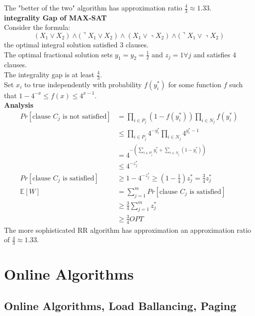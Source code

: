 \documentclass[onecolumn]{report}
\begin{document}
The "better of the two" algorithm has approximation ratio $\frac{4}{3}\approx 1.33$.\\
\textbf{integrality Gap of MAX-SAT}\\
Consider the formula:
\begin{equation*}
    \left.\left.\left.\left.\left(X_1 \vee X_2\right) \wedge(\urcorner X_1 \vee X_2\right) \wedge\left(X_1 \vee\right\urcorner X_2\right) \wedge(\urcorner X_1 \vee\right\urcorner X_2\right)
\end{equation*}
the optimal integral solution satisfied 3 clauses.\\
The optimal fractional solution sets $y_1=y_2=\frac{1}{2}$ and $z_j =1 \forall j$ and satisfies 4 clauses.\\
The integrality gap is at least $\frac{4}{3}$.\\
Set $x_i$ to true independently with probability $f(y_i^*)$ for some function $f$ such that $1-4^{-x} \leq f(x) \leq 4^{x-1}$.\\
\textbf{Analysis}\\
\begin{align*}
    Pr[\text{clause } C_j \text{ is not satisfied}] &= \prod_{i \in P_j}(1-f(y_i^*))\prod_{i \in N_j}f(y_i^*)\\
    &\leq \prod_{i \in P_j}4^{-y_i^*}\prod_{i \in N_j}4^{y_i^*-1}\\
    &= 4^{-\left(\sum_{i \in P_j}y_i^*+\sum_{i \in N_j}(1-y_i^*)\right)}\\
    &\leq 4^{-z_j^*}\\
    Pr[\text{clause } C_j \text{ is satisfied}] &\geq 1-4^{-z_j^*}\geq \left(1-\frac{1}{4}\right)z_j^* = \frac{3}{4}z_j^*\\
    \mathbb{E}[W] &= \sum_{j=1}^{m}Pr[\text{clause } C_j \text{ is satisfied}]\\
    &\geq \frac{3}{4}\sum_{j=1}^{m}z_j^*\\
    &\geq \frac{3}{4}OPT
\end{align*}
The more sophisticated RR algorithm has approximation an approximation ratio of $\frac{4}{3} \approx 1.33$.\\

\chapter{Online Algorithms}
\section{Online Algorithms, Load Ballancing, Paging}
\end{document}
